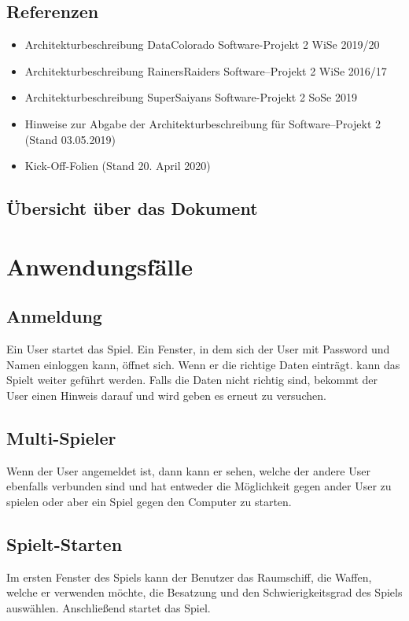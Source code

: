 \documentclass[fontsize=12pt,paper=a4,twoside]{scrartcl}
\begin{document}
\begin{longtable}{ |  l | p{12cm} |}
 \end{longtable}

\subsection{Referenzen}

\begin{itemize}
	\item Architekturbeschreibung DataColorado Software-Projekt 2 WiSe 2019/20
	\item Architekturbeschreibung RainersRaiders Software–Projekt 2 WiSe 2016/17
	\item Architekturbeschreibung SuperSaiyans Software-Projekt 2 SoSe 2019
	\item Hinweise zur Abgabe der Architekturbeschreibung für Software–Projekt 2 (Stand
	03.05.2019)

	\item Kick-Off-Folien (Stand 20. April 2020)
\end{itemize}


\subsection{Übersicht über das Dokument}

\newpage
\section{Anwendungsfälle} \label{sec:Anwendungsfälle}
\subsection{Anmeldung}
Ein User startet das Spiel. Ein Fenster, in dem sich der  User mit Password und Namen einloggen  kann, öffnet sich. Wenn er die richtige Daten einträgt. kann das Spielt  weiter geführt werden. Falls die Daten nicht richtig sind, bekommt der User  einen Hinweis darauf und wird geben es erneut zu versuchen.
\subsection{Multi-Spieler}
Wenn der User angemeldet ist, dann kann er sehen, welche der andere User ebenfalls verbunden sind und hat entweder die Möglichkeit gegen ander User zu spielen oder aber ein Spiel gegen den Computer zu starten.
\subsection{Spielt-Starten}
Im ersten Fenster des Spiels kann der Benutzer das Raumschiff, die Waffen, welche er verwenden möchte, die Besatzung und den Schwierigkeitsgrad des Spiels auswählen. Anschließend startet das Spiel.
\end{document}
